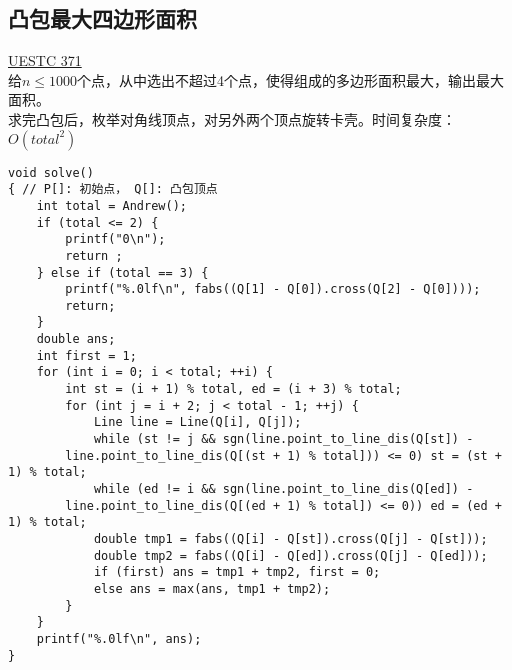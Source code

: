 \subsection{凸包最大四边形面积}
\underline{UESTC 371} \\

给$n\leq 1000$个点，从中选出不超过4个点，使得组成的多边形面积最大，输出最大面积。 \\

求完凸包后，枚举对角线顶点，对另外两个顶点旋转卡壳。时间复杂度：$O(total^{2})$\\

\begin{lstlisting}
void solve()
{ // P[]: 初始点， Q[]: 凸包顶点
	int total = Andrew();
	if (total <= 2) {
		printf("0\n");
		return ;
	} else if (total == 3) {
		printf("%.0lf\n", fabs((Q[1] - Q[0]).cross(Q[2] - Q[0])));
		return;
	}
	double ans;
	int first = 1;
	for (int i = 0; i < total; ++i) {
		int st = (i + 1) % total, ed = (i + 3) % total;
		for (int j = i + 2; j < total - 1; ++j) {
			Line line = Line(Q[i], Q[j]);
			while (st != j && sgn(line.point_to_line_dis(Q[st]) -
		line.point_to_line_dis(Q[(st + 1) % total])) <= 0) st = (st + 1) % total;
			while (ed != i && sgn(line.point_to_line_dis(Q[ed]) -
		line.point_to_line_dis(Q[(ed + 1) % total]) <= 0)) ed = (ed + 1) % total;
			double tmp1 = fabs((Q[i] - Q[st]).cross(Q[j] - Q[st]));
			double tmp2 = fabs((Q[i] - Q[ed]).cross(Q[j] - Q[ed]));
			if (first) ans = tmp1 + tmp2, first = 0;
			else ans = max(ans, tmp1 + tmp2);
		}
	}
	printf("%.0lf\n", ans);
}
\end{lstlisting}

